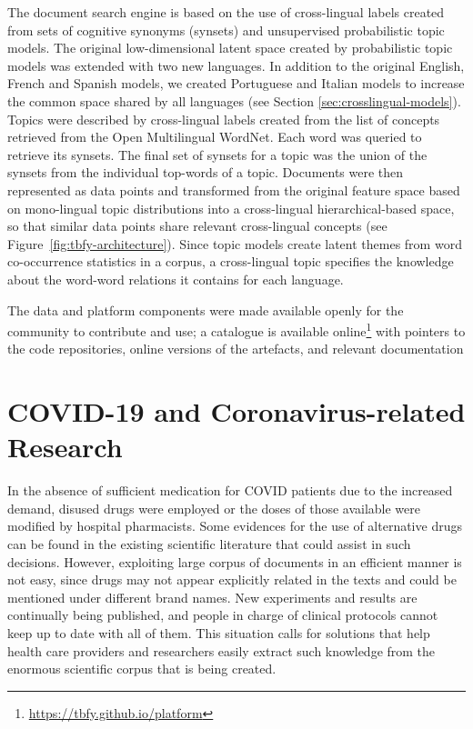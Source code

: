 The document search engine is based on the use of cross-lingual labels created from sets of cognitive synonyms (synsets) and unsupervised probabilistic topic models. The original low-dimensional latent space created by probabilistic topic models \cite{Badenes-Olmedo2019} was extended with two new languages. In addition to the original English, French and Spanish models, we created Portuguese and Italian models to increase the common space shared by all languages (see Section \ref{sec:crosslingual-models}). Topics were described by cross-lingual labels created from the list of concepts retrieved from the Open Multilingual WordNet. Each word was queried to retrieve its synsets. The final set of synsets for a topic was the union of the synsets from the individual top-words of a topic. Documents were then represented as data points and transformed from the original feature space based on mono-lingual topic distributions into a cross-lingual hierarchical-based space, so that similar data points share relevant cross-lingual concepts (see Figure~\ref{fig:tbfy-architecture}). Since topic models create latent themes from word co-occurrence statistics in a corpus, a cross-lingual topic specifies the knowledge about the word-word relations it contains for each language. 

The data and platform components were made available openly for the community to contribute and use; a catalogue is available online\footnote{\url{https://tbfy.github.io/platform}} with pointers to the code repositories, online versions of the artefacts, and relevant documentation


\section{COVID-19 and Coronavirus-related Research}
\label{sec:drugs4covid}

In the absence of sufficient medication for COVID patients due to the increased demand, disused drugs were employed or the doses of those available were modified by hospital pharmacists. Some evidences for the use of alternative drugs can be found in the existing scientific literature that could assist in such decisions. However, exploiting large corpus of documents in an efficient manner is not easy, since drugs may not appear explicitly related in the texts and could be mentioned under different brand names. New experiments and results are continually being published, and people in charge of clinical protocols cannot keep up to date with all of them. This situation calls for solutions that help health care providers and researchers easily extract such knowledge from the enormous scientific corpus that is being created.

